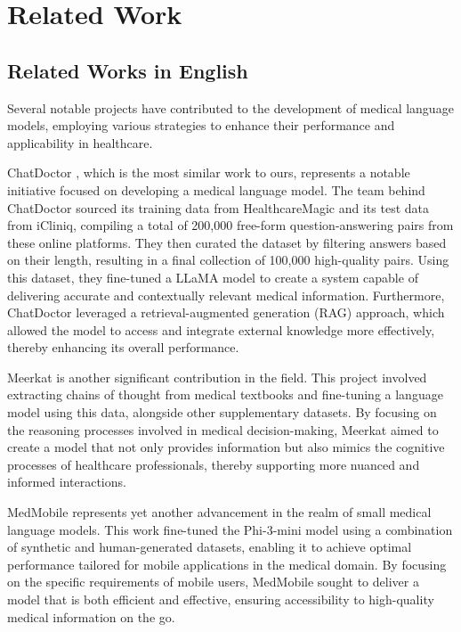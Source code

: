 \documentclass[conference]{IEEEtran}
\begin{document}
\section{Related Work}

\subsection{Related Works in English}
Several notable projects have contributed to the development of medical language models, employing various strategies to enhance their performance and applicability in healthcare.

ChatDoctor
\cite{b6}, which is the most similar work to ours, represents a notable initiative focused on developing a medical language model. The team behind ChatDoctor sourced its training data from HealthcareMagic and its test data from iCliniq, compiling a total of 200,000 free-form question-answering pairs from these online platforms. They then curated the dataset by filtering answers based on their length, resulting in a final collection of 100,000 high-quality pairs. Using this dataset, they fine-tuned a LLaMA model \cite{b7} to create a system capable of delivering accurate and contextually relevant medical information. Furthermore, ChatDoctor leveraged a retrieval-augmented generation (RAG) approach, which allowed the model to access and integrate external knowledge more effectively, thereby enhancing its overall performance.

Meerkat
\cite{b8}
is another significant contribution in the field. This project involved extracting chains of thought from medical textbooks and fine-tuning a language model using this data, alongside other supplementary datasets. By focusing on the reasoning processes involved in medical decision-making, Meerkat aimed to create a model that not only provides information but also mimics the cognitive processes of healthcare professionals, thereby supporting more nuanced and informed interactions.

MedMobile
\cite{b9}
represents yet another advancement in the realm of small medical language models. This work fine-tuned the Phi-3-mini model
\cite{b10}
using a combination of synthetic and human-generated datasets, enabling it to achieve optimal performance tailored for mobile applications in the medical domain. By focusing on the specific requirements of mobile users, MedMobile sought to deliver a model that is both efficient and effective, ensuring accessibility to high-quality medical information on the go.
\end{document}
